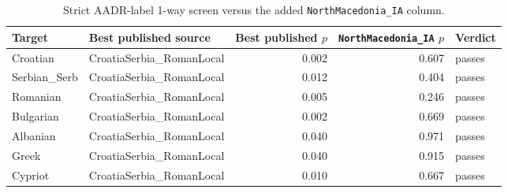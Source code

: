 \begin{table}[H]
\centering
\caption{Strict AADR-label 1-way screen versus the added \texttt{NorthMacedonia\_IA} column.}
\label{tab:main}
\small
\begin{tabular}{l l r r l}
\toprule
Target & Best published source & Best published $p$ & \texttt{NorthMacedonia\_IA} $p$ & Verdict \\
\midrule
Croatian & CroatiaSerbia\_RomanLocal & 0.002 & 0.607 & passes \\
Serbian\_Serb & CroatiaSerbia\_RomanLocal & 0.012 & 0.404 & passes \\
Romanian & CroatiaSerbia\_RomanLocal & 0.005 & 0.246 & passes \\
Bulgarian & CroatiaSerbia\_RomanLocal & 0.002 & 0.669 & passes \\
Albanian & CroatiaSerbia\_RomanLocal & 0.040 & 0.971 & passes \\
Greek & CroatiaSerbia\_RomanLocal & 0.040 & 0.915 & passes \\
Cypriot & CroatiaSerbia\_RomanLocal & 0.010 & 0.667 & passes \\
\bottomrule
\end{tabular}
\end{table}
